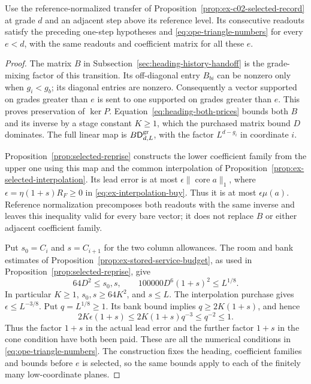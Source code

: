 \begin{lemma}
\label{lem:ope-selected-triangle}
Use the reference-normalized transfer of
Proposition~\ref{prop:ex-c02-selected-record} at grade $d$ and an
adjacent step above its reference level. Its consecutive readouts
satisfy the preceding one-step hypotheses and
\eqref{eq:ope-triangle-numbers} for every $e<d$, with the same
readouts and coefficient matrix for all these $e$.
\end{lemma}
\begin{proof}
The matrix $B$ in Subsection~\ref{sec:heading-history-handoff} is the
grade-mixing factor of this transition. Its off-diagonal entry $B_{bi}$
can be nonzero only when $g_i<g_b$; its diagonal entries are nonzero.
Consequently a vector supported on grades greater than $e$ is sent
to one supported on grades greater than $e$. This proves preservation
of $\ker P$. Equation~\ref{eq:heading-both-prices} bounds both $B$
and its inverse by a stage constant $K\ge1$, which the purchased
matrix bound $D$ dominates. The full linear map is
$B\mathsf D^{\rm gr}_{d,L}$, with the factor $L^{d-g_i}$ in coordinate $i$.

Proposition~\ref{prop:selected-reprise} constructs the lower coefficient family
from the upper one using this map and the common interpolation
of Proposition~\ref{prop:ex-selected-interpolation}. Its lead error
is at most $\epsilon\|\operatorname{core}a\|_1$, where
$\epsilon=\eta(1+s)R_F\ge0$ in
\eqref{eq:ex-interpolation-buy}. Thus it is at most
$\epsilon\mu(a)$. Reference normalization precomposes both readouts
with the same inverse and leaves this inequality valid for every
bare vector; it does not replace $B$ or either adjacent coefficient family.

Put $s_0=C_i$ and $s=C_{i+1}$ for the two column allowances. The room
and bank estimates of Proposition~\ref{prop:ex-stored-service-budget},
as used in Proposition~\ref{prop:selected-reprise}, give
\[
 64D^2\le s_0,s,\qquad
 100000D^6(1+s)^2\le L^{1/8}.
\]
In particular $K\ge1$, $s_0,s\ge64K^2$, and $s\le L$.
The interpolation purchase gives $\epsilon\le L^{-3/8}$.
Put $q=L^{1/8}\ge1$. Its bank bound implies
$q\ge2K(1+s)$, and hence
\[
 2K\epsilon(1+s)\le2K(1+s)q^{-3}\le q^{-2}\le1.
\]
Thus the factor $1+s$ in the actual lead error and the further factor
$1+s$ in the cone condition have both been paid.
These are all the numerical conditions in
\eqref{eq:ope-triangle-numbers}. The construction fixes the heading,
coefficient families and bounds before $e$ is selected, so the same bounds apply
to each of the finitely many low-coordinate planes.
\end{proof}

